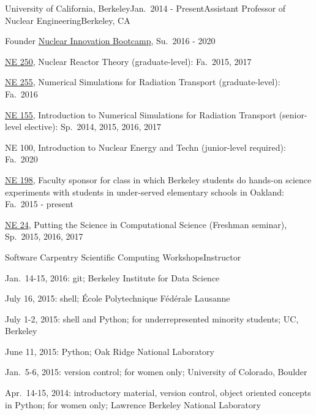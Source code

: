 \begin{rSubsection}{University of California, Berkeley}{Jan.\ 2014 - Present}{Assistant Professor of Nuclear Engineering}{Berkeley, CA}
\item Founder \href{http://nuclearinnovationalliance.org/bootcamp}{Nuclear
Innovation Bootcamp}, Su.\ 2016 - 2020 
\item \href{https://github.com/rachelslaybaugh/NE250 }{NE 250}, Nuclear Reactor Theory (graduate-level): Fa.\ 2015, 2017
\item \href{https://github.com/rachelslaybaugh/NE255}{NE 255}, Numerical Simulations for Radiation Transport (graduate-level): Fa.\ 2016
\item \href{https://github.com/rachelslaybaugh/NE155}{NE 155}, Introduction to Numerical Simulations for Radiation Transport (senior-level elective): Sp.\ 2014, 2015, 2016, 2017
\item NE 100, Introduction to Nuclear Energy and Techn (junior-level required):
Fa.\ 2020 
\item \href{http://soesberkeley.weebly.com/}{NE 198}, Faculty sponsor for class
in which Berkeley students do hands-on science experiments with students in
under-served elementary schools in Oakland: Fa.\ 2015 - present
\item \href{https://github.com/rachelslaybaugh/NE24}{NE 24}, Putting the Science in Computational Science (Freshman seminar), Sp.\ 2015, 2016, 2017
\end{rSubsection}


\begin{rSubsection}{Software Carpentry Scientific Computing Workshops}{}{Instructor}{}
\item Jan.\ 14-15, 2016: git; Berkeley Institute for Data Science
\item July 16, 2015: shell; \'{E}cole Polytechnique F\'{e}d\'{e}rale Lausanne
\item July 1-2, 2015: shell and Python; for underrepresented minority students; UC, Berkeley
\item June 11, 2015: Python; Oak Ridge National Laboratory
\item Jan.\ 5-6, 2015: version control; for women only; University of Colorado, Boulder
\item Apr.\ 14-15, 2014: introductory material, version control, object oriented concepts in Python; for women only; Lawrence Berkeley National Laboratory
\end{rSubsection}


